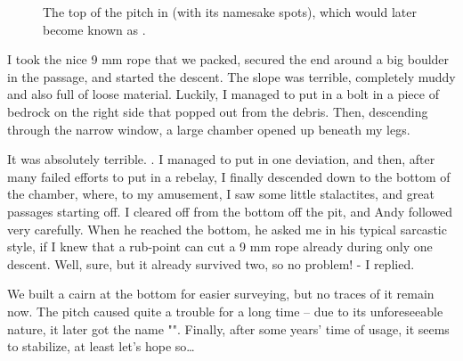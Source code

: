 \begin{figure}[t!]
\checkoddpage \ifoddpage \forcerectofloat \else \forceversofloat \fi
{}
\caption{The top of the pitch in \protect{} (with its namesake spots), which would later become known as \protect{}. }
\end{figure}

I took the nice 9 mm rope that we packed, secured the end around a big boulder in the passage, and started the descent. The slope was terrible, completely muddy and also full of loose material. Luckily, I managed to
put in a bolt in a piece of bedrock on the right side that popped out from the debris. Then, descending through the narrow window, a large chamber opened up beneath my legs.

It was absolutely terrible. . I managed to put in one deviation, and then, after many failed efforts to put in a rebelay, I finally descended down to the bottom of the chamber, where, to my amusement, I saw some little stalactites, and great passages starting off. I cleared off from the bottom off the pit, and Andy followed very carefully. When he reached the bottom, he asked me in his typical sarcastic style, if I knew that a rub-point can cut a 9 mm rope already during only one descent. Well, sure, but it already survived two, so no problem! - I replied.

We built a cairn at the bottom for easier surveying, but no traces of it remain now. The pitch caused quite a trouble for a long time -- due to its unforeseeable nature, it later got the name "". Finally, after some years' time of usage, it seems to stabilize, at least let's hope so\ldots{}


